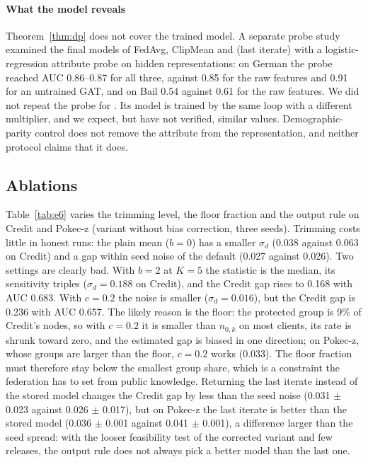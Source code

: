 \paragraph{What the model reveals}
Theorem~\ref{thm:dp} does not cover the trained model. A separate probe study examined the final models of FedAvg, ClipMean and \clamp{} (last iterate) with a logistic-regression attribute probe on hidden representations: on German the probe reached AUC 0.86--0.87 for all three, against 0.85 for the raw features and 0.91 for an untrained GAT, and on Bail 0.54 against 0.61 for the raw features. We did not repeat the probe for \rt{}. Its model is trained by the same loop with a different multiplier, and we expect, but have not verified, similar values. Demographic-parity control does not remove the attribute from the representation, and neither protocol claims that it does.

\subsection{Ablations}\label{sec:ablation}



Table~\ref{tab:e6} varies the trimming level, the floor fraction and the output rule on Credit and Pokec-z (variant without bias correction, three seeds). Trimming costs little in honest runs: the plain mean ($b=0$) has a smaller $\sigma_d$ (0.038 against 0.063 on Credit) and a gap within seed noise of the default (0.027 against 0.026). Two settings are clearly bad. With $b=2$ at $K=5$ the statistic is the median, its sensitivity triples ($\sigma_d=0.188$ on Credit), and the Credit gap rises to 0.168 with AUC 0.683. With $c=0.2$ the noise is smaller ($\sigma_d=0.016$), but the Credit gap is 0.236 with AUC 0.657. The likely reason is the floor: the protected group is 9\% of Credit's nodes, so with $c=0.2$ it is smaller than $n_{0,k}$ on most clients, its rate is shrunk toward zero, and the estimated gap is biased in one direction; on Pokec-z, whose groups are larger than the floor, $c=0.2$ works (0.033). The floor fraction must therefore stay below the smallest group share, which is a constraint the federation has to set from public knowledge. Returning the last iterate instead of the stored model changes the Credit gap by less than the seed noise (0.031 $\pm$ 0.023 against 0.026 $\pm$ 0.017), but on Pokec-z the last iterate is better than the stored model (0.036 $\pm$ 0.001 against 0.041 $\pm$ 0.001), a difference larger than the seed spread: with the looser feasibility test of the corrected variant and few releases, the output rule does not always pick a better model than the last one.

